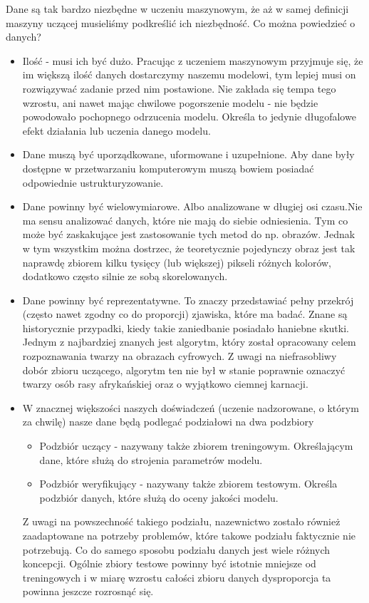 \documentclass[10pt,a4paper]{book}
\begin{document}
Dane są tak bardzo niezbędne w uczeniu maszynowym, że aż w samej definicji maszyny uczącej musieliśmy podkreślić ich niezbędność. Co można powiedzieć o danych?
\begin{itemize}
\item Ilość - musi ich być dużo. Pracując z uczeniem maszynowym przyjmuje się, że im większą ilość danych dostarczymy naszemu modelowi, tym lepiej musi on rozwiązywać zadanie przed nim postawione. Nie zakłada się tempa tego wzrostu, ani nawet mając chwilowe pogorszenie modelu - nie będzie powodowało pochopnego odrzucenia modelu. Określa to jedynie długofalowe efekt działania lub uczenia danego modelu.
\item Dane muszą być uporządkowane, uformowane i uzupełnione. Aby dane były dostępne w przetwarzaniu komputerowym muszą bowiem posiadać odpowiednie ustrukturyzowanie.
\item Dane powinny być wielowymiarowe. Albo analizowane w długiej osi czasu.Nie ma sensu analizować danych, które nie mają do siebie odniesienia. Tym co może być zaskakujące jest zastosowanie tych metod do np. obrazów. Jednak w tym wszystkim można dostrzec, że teoretycznie pojedynczy obraz jest tak naprawdę zbiorem kilku tysięcy (lub większej) pikseli różnych kolorów, dodatkowo często silnie ze sobą skorelowanych.  
\item Dane powinny być reprezentatywne. To znaczy przedstawiać pełny przekrój (często nawet zgodny co do proporcji) zjawiska, które ma badać. Znane są historycznie przypadki, kiedy takie zaniedbanie posiadało haniebne skutki. Jednym z najbardziej znanych jest algorytm, który został opracowany celem rozpoznawania twarzy na obrazach cyfrowych. Z uwagi na niefrasobliwy dobór zbioru uczącego, algorytm ten nie był w stanie poprawnie oznaczyć twarzy osób rasy afrykańskiej oraz o wyjątkowo ciemnej karnacji. 
\item W znacznej większości naszych doświadczeń (uczenie nadzorowane, o którym za chwilę) nasze dane będą podlegać podziałowi na dwa podzbiory
\begin{itemize}
\item Podzbiór uczący - nazywany także zbiorem treningowym. Określającym dane, które służą do strojenia parametrów modelu. 
\item Podzbiór weryfikujący - nazywany także zbiorem testowym. Określa podzbiór danych, które służą do oceny jakości modelu.
\end{itemize}
Z uwagi na powszechność takiego podziału, nazewnictwo zostało również zaadaptowane na potrzeby problemów, które takowe podziału faktycznie nie potrzebują. Co do samego sposobu podziału danych jest wiele różnych koncepcji. Ogólnie zbiory testowe powinny być istotnie mniejsze od treningowych i w miarę wzrostu całości zbioru danych dysproporcja ta powinna jeszcze rozrosnąć się. 
\end{itemize}
\end{document}

